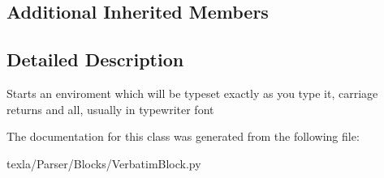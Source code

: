 \subsection*{Additional Inherited Members}


\subsection{Detailed Description}
\begin{DoxyVerb}Starts an enviroment which will be typeset exactly
as you type it, carriage returns and all, usually in typewriter font\end{DoxyVerb}
 

The documentation for this class was generated from the following file\+:\begin{DoxyCompactItemize}
\item 
texla/\+Parser/\+Blocks/Verbatim\+Block.\+py\end{DoxyCompactItemize}
